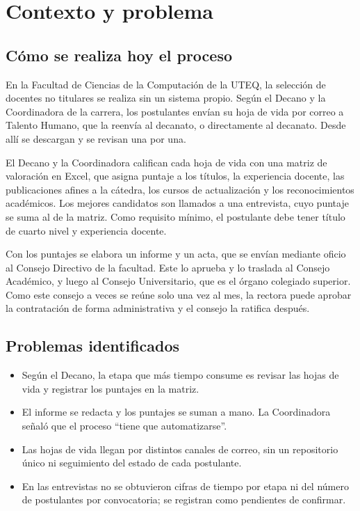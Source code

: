 \section{Contexto y problema}

\subsection{Cómo se realiza hoy el proceso}
En la Facultad de Ciencias de la Computación de la UTEQ, la selección de docentes no
titulares se realiza sin un sistema propio. Según el Decano y la Coordinadora de la
carrera, los postulantes envían su hoja de vida por correo a Talento Humano, que la
reenvía al decanato, o directamente al decanato. Desde allí se descargan y se revisan
una por una.

El Decano y la Coordinadora califican cada hoja de vida con una matriz de valoración
en Excel, que asigna puntaje a los títulos, la experiencia docente, las publicaciones
afines a la cátedra, los cursos de actualización y los reconocimientos académicos. Los
mejores candidatos son llamados a una entrevista, cuyo puntaje se suma al de la matriz.
Como requisito mínimo, el postulante debe tener título de cuarto nivel y experiencia
docente.

Con los puntajes se elabora un informe y un acta, que se envían mediante oficio al
Consejo Directivo de la facultad. Este lo aprueba y lo traslada al Consejo Académico,
y luego al Consejo Universitario, que es el órgano colegiado superior. Como este
consejo a veces se reúne solo una vez al mes, la rectora puede aprobar la contratación
de forma administrativa y el consejo la ratifica después.

\subsection{Problemas identificados}
\begin{itemize}
  \item Según el Decano, la etapa que más tiempo consume es revisar las hojas de vida
        y registrar los puntajes en la matriz.
  \item El informe se redacta y los puntajes se suman a mano. La Coordinadora señaló
        que el proceso \enquote{tiene que automatizarse}.
  \item Las hojas de vida llegan por distintos canales de correo, sin un
        repositorio único ni seguimiento del estado de cada postulante.
  \item En las entrevistas no se obtuvieron cifras de tiempo por etapa ni del número
        de postulantes por convocatoria; se registran como pendientes de confirmar.
\end{itemize}

